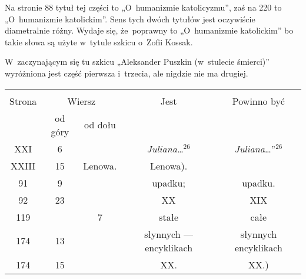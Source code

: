 \documentclass[a4paper,11pt]{article}
\begin{document}
\start {} Na stronie 88 tytuł tej części to „O~humanizmie
katolicyzmu”, zaś na 220 to „O~humanizmie katolickim”. Sens tych dwóch
tytułów jest oczywiście diametralnie różny. Wydaje się, że~poprawny to
„O~humanizmie katolickim” bo takie słowa są użyte w~tytule szkicu
o~Zofii Kossak.

\vspace{\spaceFour}



\start {} W~zaczynającym się tu szkicu „Aleksander Puszkin
(w~stulecie śmierci)” wyróżniona jest część pierwsza i~trzecia, ale
nigdzie nie ma drugiej.

\vspace{\spaceFour}







\begin{center}

  \begin{tabular}{|c|c|c|c|c|}
    \hline
    & \multicolumn{2}{c|}{} & & \\
    Strona & \multicolumn{2}{c|}{Wiersz} & Jest
                              & Powinno być \\ \cline{2-3}
    & od góry & od dołu & & \\
    \hline
    XXI   &  6 & & \textit{Juliana}\ldots$^{ 26 }$
           & \textit{Juliana}\ldots”$^{ 26 }$ \\
    XXIII & 15 & Lenowa. & Lenowa). \\
    91  &  9 & & upadku; & upadku. \\
    92  & 23 & & XX & XIX \\
    119 & & 7 & stałe & całe \\
    174 & 13 & & słynnych --- encyklikach & słynnych encyklikach \\
    174 & 15 & & XX. & XX.) \\
    \hline
  \end{tabular}

\end{center}


\vspace{\spaceTwo}
\end{document}
